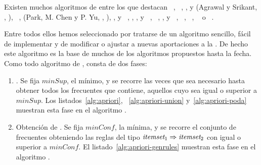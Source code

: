 Existen muchos algoritmos de \arm entre los que destacan 
~\citep{AgrawalImielinskiSwami_MiningAssociationRulesBetweenSetsOfItemsInLargeDB_1993}, 
~\citep{HoutsmaSwami_SETMofAR_1993}, 
,  y  (Agrawal y Srikant, \cite*{AgrawalSrikant_FastAlgorithmsForMiningAssociationRules_1994}, \cite*{AgrawalSrikant-FastAlgorithmsForMiningAssociationRules-LARGO-1994}), 
~\citep{SavasereOmiecinskiNavathe_AnEfficientAlgorithmForARM_1995}, 
 (Park, M. Chen y P. Yu, \cite*{ParkChenYu_AnEffectiveHashBasedAlgorithmForARM_1995}, \cite*{ParkChenYu_UsingAHashBasedMethod_1997}), 
,  y ~\citep{AgrawalShafer_ParallelMAR_1996}, 
, ,  y ~\citep{ZakiParthasarathyOgiharaL_NewAlgorithms_1997}, 
~\citep{BrinMotwaniUllmanTsur_DynamicItemsetCounting_1997}, 
,  y ~\citep{SrikantAgrawal_MiningGeneralizedAR_1997}, 
~\citep{Bayardo-EfficientlyMiningLongPatternsFromDB-1998}, 
~\citep{GrothRoberston_DiscoveringFrequentItemsets_2001}, 
~\citep{LinKedem_PincerSearchFIM_2002} o 
~\citep{HanPeiYin_MiningFrequentPatternsWithoutCandidateGeneration_2000,HanPeiYinMao_MiningFrequentPatternsWithoutCandidateGenerationAFPTreeApproach_2004}.


Entre todos ellos hemos seleccionado \apriori por tratarse de un algoritmo sencillo, fácil de implementar y de modificar o ajustar a nuevas aportaciones a la \arm. De hecho este algoritmo es la base de muchos de los algoritmos propuestos hasta la fecha. Como todo algoritmo de \ARM, \apriori consta de dos fases:
\begin{enumerate}
   \item \fim. Se fija $minSup$, el \soporte mínimo, y se recorre \D las veces que sea necesario hasta obtener todos los \itemsets frecuentes que contiene, aquellos cuyo \soporte sea igual o superior a $minSup$. Los listados~\ref{alg:apriori}, ~\ref{alg:apriori-union} y~\ref{alg:apriori-poda} muestran esta fase en el algoritmo \apriori.
   \item Obtención de \ARs. Se fija $minConf$, la \confianza mínima, y se recorre el conjunto de \itemsets frecuentes \aprioriL obteniendo las reglas del tipo $\itemset_1 \Rightarrow \itemset_2$ con \confianza igual o superior a $minConf$. El listado~\ref{alg:apriori-genrules} muestran esta fase en el algoritmo \apriori.
\end{enumerate}


